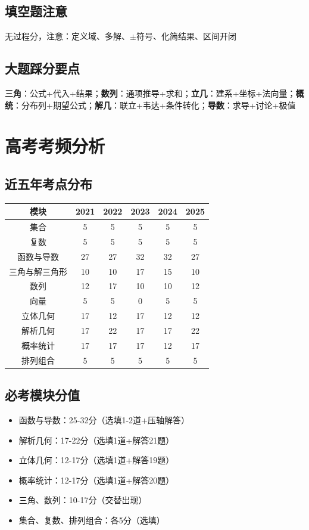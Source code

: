 \documentclass[12pt,a4paper]{ctexbook}
\begin{document}
\section{填空题注意}
无过程分，注意：定义域、多解、$\pm$符号、化简结果、区间开闭

\section{大题踩分要点}
\textbf{三角}：公式+代入+结果；\textbf{数列}：通项推导+求和；\textbf{立几}：建系+坐标+法向量；\textbf{概统}：分布列+期望公式；\textbf{解几}：联立+韦达+条件转化；\textbf{导数}：求导+讨论+极值

\chapter{高考考频分析}

\section{近五年考点分布}
\begin{center}
\begin{tabular}{c|c|c|c|c|c}
模块 & 2021 & 2022 & 2023 & 2024 & 2025 \\ \hline
集合 & 5 & 5 & 5 & 5 & 5 \\
复数 & 5 & 5 & 5 & 5 & 5 \\
函数与导数 & 27 & 27 & 32 & 32 & 27 \\
三角与解三角形 & 10 & 10 & 17 & 15 & 10 \\
数列 & 12 & 17 & 10 & 10 & 12 \\
向量 & 5 & 5 & 0 & 5 & 5 \\
立体几何 & 17 & 12 & 17 & 12 & 12 \\
解析几何 & 17 & 22 & 17 & 17 & 22 \\
概率统计 & 17 & 17 & 17 & 12 & 17 \\
排列组合 & 5 & 5 & 5 & 5 & 5
\end{tabular}
\end{center}

\section{必考模块分值}
\begin{itemize}
  \item 函数与导数：25-32分（选填1-2道+压轴解答）
  \item 解析几何：17-22分（选填1道+解答21题）
  \item 立体几何：12-17分（选填1道+解答19题）
  \item 概率统计：12-17分（选填1道+解答20题）
  \item 三角、数列：10-17分（交替出现）
  \item 集合、复数、排列组合：各5分（选填）
\end{itemize}
\end{document}

